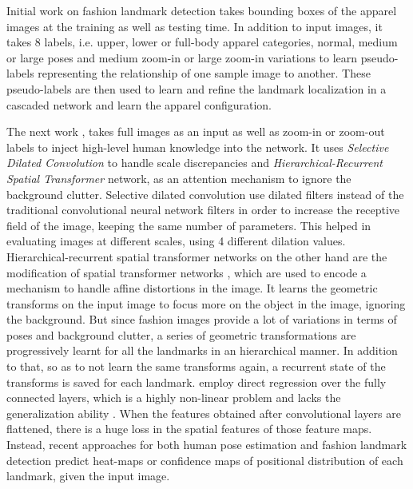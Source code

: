\documentclass[conference]{IEEEtran}
\begin{document}
Initial work on fashion landmark detection \cite{liu2016fashion} takes bounding boxes of the apparel images at the training as well as testing time. In addition to input images, it takes 8 labels, i.e. upper, lower or full-body apparel categories, normal, medium or large poses and medium zoom-in or large zoom-in variations to learn pseudo-labels representing the relationship of one sample image to another. These pseudo-labels are then used to learn and refine the landmark localization in a cascaded network and learn the apparel configuration.

 The next work \cite{yan2017unconstrained}, takes full images as an input as well as zoom-in or zoom-out labels to inject high-level human knowledge into the network. It uses \textit{Selective Dilated Convolution} to handle scale discrepancies and \textit{Hierarchical-Recurrent Spatial Transformer} network, as an attention mechanism to ignore the background clutter. Selective dilated convolution use dilated filters instead of the traditional convolutional neural network filters in order to increase the receptive field of the image, keeping the same number of parameters. This helped in evaluating images at different scales, using 4 different dilation values. Hierarchical-recurrent spatial transformer networks on the other hand are the modification of spatial transformer networks \cite{jaderberg2015spatial}, which are used to encode a mechanism to handle affine distortions in the image. It learns the geometric transforms on the input image to focus more on the object in the image, ignoring the background. But since fashion images provide a lot of variations in terms of poses and background clutter, a series of geometric transformations are progressively learnt for all the landmarks in an hierarchical manner. In addition to that, so as to not learn the same transforms again, a recurrent state of the transforms is saved for each landmark. \cite{liu2016fashion, yan2017unconstrained} employ direct regression over the fully connected layers, which is a highly non-linear problem and lacks the generalization ability \cite{lin2013network}. When the features obtained after convolutional layers are flattened, there is a huge loss in the spatial features of those feature maps. Instead, recent approaches for both human pose estimation \cite{yang2017learning, chen2017adversarial, chu2017multi} and fashion landmark detection \cite{wang2018attentive} predict heat-maps or confidence maps of positional distribution of each landmark, given the input image.
\end{document}
